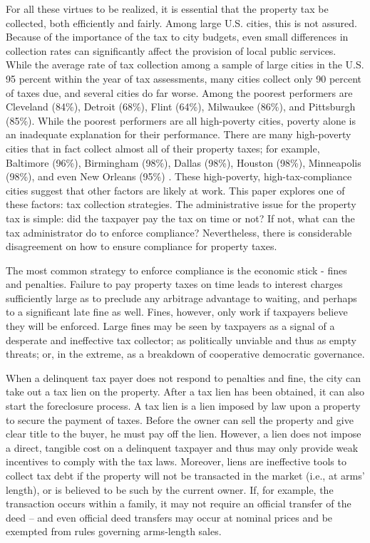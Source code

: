 \documentclass[12pt]{article}
\begin{document}
For all these virtues to be realized, it is essential that the
property tax be collected, both efficiently and fairly.  Among large
U.S. cities, this is not assured.  Because of the importance of the
tax to city budgets, even small differences in collection rates can
significantly affect the provision of local public services. While the
average rate of tax collection among a sample of large cities in the U.S.
95 percent within the year of tax assessments, many cities collect
only 90 percent of taxes due, and several cities do far worse.  Among
the poorest performers are Cleveland (84\%), Detroit (68\%), Flint
(64\%), Milwaukee (86\%), and Pittsburgh (85\%). While the poorest
performers are all high-poverty cities, poverty alone is an inadequate
explanation for their performance. There are many high-poverty cities
that in fact collect almost all of their property taxes; for example,
Baltimore (96\%), Birmingham (98\%), Dallas (98\%), Houston (98\%),
Minneapolis (98\%), and even New Orleans (95\%) \cite{CILMS-16}.
These high-poverty, high-tax-compliance cities suggest that other
factors are likely at work.  This paper explores one of these factors:
tax collection strategies. The administrative issue for the
property tax is simple: did the taxpayer pay the tax on time or not?
If not, what can the tax administrator do to enforce compliance?
Nevertheless, there is considerable disagreement on how to ensure 
compliance for property taxes. 

The most common strategy to enforce compliance is the economic stick -
fines and penalties.  Failure to pay property taxes on time leads to
interest charges sufficiently large as to preclude any arbitrage
advantage to waiting, and perhaps to a significant late fine as well.
Fines, however, only work if taxpayers believe they will be enforced.  Large
fines may be seen by taxpayers as a signal of a desperate and
ineffective tax collector; as politically unviable and thus as empty
threats; or, in the extreme, as a breakdown of cooperative democratic
governance.

When a delinquent tax payer does not respond to penalties and fine, 
the city can take out a tax lien
on the property.  After a tax lien has been obtained, it can also
start the foreclosure process.  A tax lien is a lien imposed by law upon a
property to secure the payment of taxes.  Before the owner can sell
the property and give clear title to the buyer, he must pay off the
lien. However, a lien does not impose a direct, tangible cost on a delinquent
taxpayer and thus may only provide weak incentives to comply with the
tax laws. Moreover, liens are ineffective tools to collect tax debt if
the property will not be transacted in the market (i.e., at arms' length), 
or is believed to be such by the current owner. If, for example, the
transaction occurs within a family, it may not require an official
transfer of the deed -- and even official deed transfers may occur at 
nominal prices and be exempted from rules governing arms-length sales.
\end{document}
